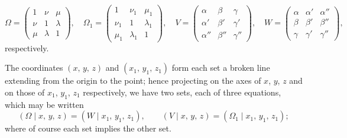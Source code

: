 \documentclass[11pt]{article}
\begin{document}
\[
   \Omega = \begin{pmatrix} 1 & \nu & \mu \\ \nu & 1 & \lambda \\ \mu & \lambda & 1 \end{pmatrix},\quad
   \Omega_1 = \begin{pmatrix} 1 & \nu_1 & \mu_1 \\ \nu_1 & 1 & \lambda_1 \\ \mu_1 & \lambda_1 & 1 \end{pmatrix},\quad
   V = \begin{pmatrix} \alpha & \beta & \gamma \\ \alpha' & \beta' & \gamma' \\ \alpha'' & \beta'' & \gamma'' \end{pmatrix},\quad
   W = \begin{pmatrix} \alpha & \alpha' & \alpha'' \\ \beta & \beta' & \beta'' \\ \gamma & \gamma' & \gamma'' \end{pmatrix},
\]
respectively.

\medskip

The coordinates $(x,\, y,\, z)$ and $(x_1,\, y_1,\, z_1)$ form each set a broken line extending
from the origin to the point; hence projecting on the axes of $x$, $y$, $z$ and on those
of $x_1$, $y_1$, $z_1$ respectively, we have two sets, each of three equations, which may be
written
\[
   (\Omega \mid x,\, y,\, z) = (W \mid x_1,\, y_1,\, z_1),\qquad
   (V \mid x,\, y,\, z) = (\Omega_1 \mid x_1,\, y_1,\, z_1);
\]
where of course each set implies the other set.
\end{document}

